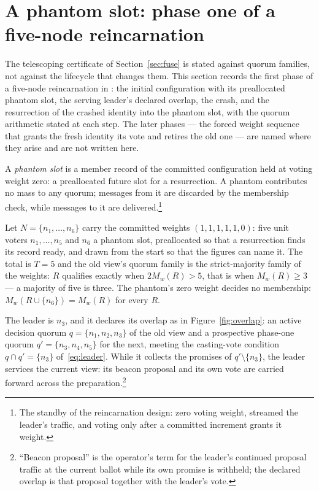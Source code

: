 \section{A phantom slot: phase one of a five-node
reincarnation}\label{sec:phantom}
The telescoping certificate of Section~\ref{sec:fuse} is stated against quorum
families, not against the lifecycle that changes them. This section records the
first phase of a five-node reincarnation in \systemname{}: the initial
configuration with its preallocated phantom slot, the serving leader's declared
overlap, the crash, and the resurrection of the crashed identity into the
phantom slot, with the quorum arithmetic stated at each step. The later phases
--- the forced weight sequence that grants the fresh identity its vote and
retires the old one --- are named where they arise and are not written here.

\begin{definition}\label{def:phantom}
A \emph{phantom slot} is a member record of the committed configuration held at
voting weight zero: a preallocated future slot for a resurrection. A phantom
contributes no mass to any quorum; messages from it are discarded by the
membership check, while messages to it are delivered.\footnote{The standby of
the reincarnation design: zero voting weight, streamed the leader's traffic,
and voting only after a committed increment grants it weight.}
\end{definition}

Let $N=\{n_1,\dotsc,n_6\}$ carry the committed weights $(1,1,1,1,1,0)$: five
unit voters $n_1,\dotsc,n_5$ and $n_6$ a phantom slot, preallocated so that a
resurrection finds its record ready, and drawn from the start so that the
figures can name it. The total is $T=5$ and the old view's quorum family is the
strict-majority family of the weights: $R$ qualifies exactly when
$2M_w(R)>5$, that is when $M_w(R)\geq3$ --- a majority of five is three. The
phantom's zero weight decides no membership: $M_w(R\cup\{n_6\})=M_w(R)$ for
every $R$.

The leader is $n_3$, and it declares its overlap as in
Figure~\ref{fig:overlap}: an active decision quorum $q=\{n_1,n_2,n_3\}$ of the
old view and a prospective phase-one quorum $q'=\{n_3,n_4,n_5\}$ for the next,
meeting the casting-vote condition $q\cap q'=\{n_3\}$ of~\eqref{eq:leader}.
While it collects the promises of $q'\setminus\{n_3\}$, the leader services the
current view: its beacon proposal and its own vote are carried forward across
the preparation.\footnote{``Beacon proposal'' is the operator's term for the
leader's continued proposal traffic at the current ballot while its own promise
is withheld; the declared overlap is that proposal together with the leader's
vote.}


